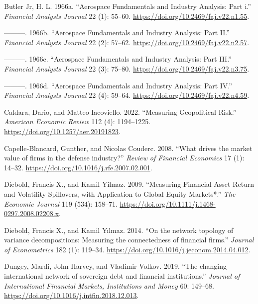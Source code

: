 \documentclass[
  letterpaper,
  DIV=11,
  numbers=noendperiod]{scrartcl}
\newlength{\cslhangindent}
\newlength{\cslentryspacingunit} %
\newenvironment{CSLReferences}[2] %
 {%
  \setlength{\parindent}{0pt}
  \ifodd #1
  \let\oldpar\par
  \def\par{\hangindent=\cslhangindent\oldpar}
  \fi
  \setlength{\parskip}{#2\cslentryspacingunit}
 }%
 {}
\begin{document}
\begin{CSLReferences}{1}{0}
\leavevmode{}%
Butler Jr, H. L. 1966a. {``Aerospace Fundamentals and Industry Analysis:
Part i.''} \emph{Financial Analysts Journal} 22 (1): 55--60.
\url{https://doi.org/10.2469/faj.v22.n1.55}.

\leavevmode{}%
---------. 1966b. {``Aerospace Fundamentals and Industry Analysis: Part
II.''} \emph{Financial Analysts Journal} 22 (2): 57--62.
\url{https://doi.org/10.2469/faj.v22.n2.57}.

\leavevmode{}%
---------. 1966c. {``Aerospace Fundamentals and Industry Analysis: Part
III.''} \emph{Financial Analysts Journal} 22 (3): 75--80.
\url{https://doi.org/10.2469/faj.v22.n3.75}.

\leavevmode{}%
---------. 1966d. {``Aerospace Fundamentals and Industry Analysis: Part
IV.''} \emph{Financial Analysts Journal} 22 (4): 59--64.
\url{https://doi.org/10.2469/faj.v22.n4.59}.

\leavevmode{}%
Caldara, Dario, and Matteo Iacoviello. 2022. {``Measuring Geopolitical
Risk.''} \emph{American Economic Review} 112 (4): 1194--1225.
\url{https://doi.org/10.1257/aer.20191823}.

\leavevmode{}%
Capelle‐Blancard, Gunther, and Nicolas Couderc. 2008. {``{What drives
the market value of firms in the defense industry?}''} \emph{Review of
Financial Economics} 17 (1): 14--32.
\url{https://doi.org/10.1016/j.rfe.2007.02.001}.

\leavevmode{}%
Diebold, Francis X., and Kamil Yilmaz. 2009. {``{Measuring Financial
Asset Return and Volatility Spillovers, with Application to Global
Equity Markets*}.''} \emph{The Economic Journal} 119 (534): 158--71.
\url{https://doi.org/10.1111/j.1468-0297.2008.02208.x}.

\leavevmode{}%
Diebold, Francis X., and Kamil Yılmaz. 2014. {``{On the network topology
of variance decompositions: Measuring the connectedness of financial
firms}.''} \emph{Journal of Econometrics} 182 (1): 119--34.
\url{https://doi.org/10.1016/j.jeconom.2014.04.012}.

\leavevmode{}%
Dungey, Mardi, John Harvey, and Vladimir Volkov. 2019. {``{The changing
international network of sovereign debt and financial institutions}.''}
\emph{Journal of International Financial Markets, Institutions and
Money} 60: 149--68. \url{https://doi.org/10.1016/j.intfin.2018.12.013}.


\end{CSLReferences}
\end{document}
